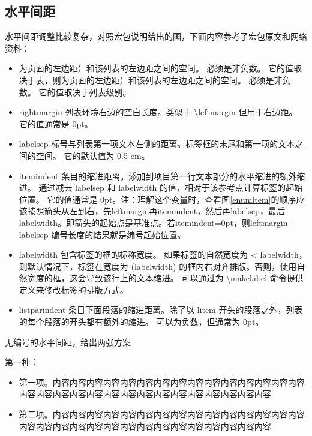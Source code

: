 \subsection{水平间距}
水平间距调整比较复杂，对照宏包说明给出的图，下面内容参考了宏包原文和网络资料：
\begin{itemize}[topsep = 0 pt, itemsep= 0 pt, parsep=0pt, partopsep=0pt, leftmargin=36pt, itemindent=0pt, labelsep=6pt, listparindent=24pt]
	\item 为页面的左边距）和该列表的左边距之间的空间。 必须是非负数。 它的值取决于表，则为页面的左边距）和该列表的左边距之间的空间。 必须是非负数。 它的值取决于列表级别。
	\item rightmargin       列表环境右边的空白长度。类似于 \textbackslash{}leftmargin 但用于右边距。 它的值通常是 0pt。
	\item labelsep       标号与列表第一项文本左侧的距离。标签框的末尾和第一项的文本之间的空间。 它的默认值为 0.5 em。
	\item itemindent       条目的缩进距离。添加到项目第一行文本部分的水平缩进的额外缩进。 通过减去 labelsep 和 labelwidth 的值，相对于该参考点计算标签的起始位置。 它的值通常是 0pt。注：理解这个变量时，查看图\ref{enumitem}的顺序应该按照箭头从左到右，先leftmargin再itemindent，然后再labelsep，最后labelwidth。即箭头的起始点是基准点。若itemindent=0pt，则leftmargin-labelsep-编号长度的结果就是编号起始位置。
	\item labelwidth       包含标签的框的标称宽度。 如果标签的自然宽度为 < labelwidth，则默认情况下，标签在宽度为 (labelwidth) 的框内右对齐排版。否则，使用自然宽度的框，这会导致该行上的文本缩进。 可以通过为 \textbackslash{}makelabel 命令提供定义来修改标签的排版方式。
	\item listparindent       条目下面段落的缩进距离。除了以 litem 开头的段落之外，列表的每个段落的开头都有额外的缩进。 可以为负数，但通常为 0pt。
\end{itemize}

无编号的水平间距，给出两张方案
 
第一种：
\begin{itemize}[topsep = 0 pt, itemsep= 0 pt, parsep=0pt, partopsep=0pt, leftmargin=36pt, itemindent=0pt, labelsep=6pt, listparindent=24pt]
	\item 第一项。内容内容内容内容内容内容内容内容内容内容内容内容内容内容内容内容内容内容内容内容内容内容内容内容内容内容内容内容内容内容

	\item 第二项。内容内容内容内容内容内容内容内容内容内容内容内容内容内容内容内容内容内容内容内容内容内容内容内容内容内容内容内容内容内容
	
\end{itemize}


